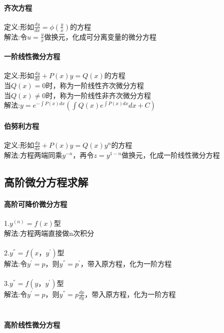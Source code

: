 \documentclass{article}
\begin{document}
\begin{flushleft}
	 \paragraph{齐次方程}
	 定义:形如$\frac{dy}{dx}=\phi(\frac{y}{x})$的方程\\
	 解法:令$u=\frac{y}{x}$做换元，化成可分离变量的微分方程\\
	 
	 \paragraph{一阶线性微分方程}
	 定义:形如$\frac{dy}{dx}+P(x)y=Q(x)$的方程\\
	 当$Q(x)=0$时，称为一阶线性齐次微分方程\\
	 当$Q(x)\neq 0$时，称为一阶线性非齐次微分方程\\
	 解法:$y=e^{-\int P(x)dx}(\int Q(x)e^{\int P(x)dx}dx+C)$\\
	 
	 \paragraph{伯努利方程}
	 定义:形如$\frac{dy}{dx}+P(x)y=Q(x)y^n$的方程\\
	 解法:方程两端同乘$y^{-n}$，再令$z=y^{1-n}$做换元，化成一阶线性微分方程\\
	 
	 \subsection{高阶微分方程求解}
	 
	 \paragraph{高阶可降价微分方程}
	 1.$y^{(n)}=f(x)$型\\
	 解法:方程两端直接做n次积分\\
	 ~\\
	 2.$y^{''}=f(x，y^{'})$型\\
	 解法:令$y^{'}=p$，则$y^{''}=p^{'}$，带入原方程，化为一阶方程\\
	 ~\\
	 3.$y^{''}=f(y，y^{'})$型\\
	 解法:令$y^{'}=p$，则$y^{''}=p\frac{dp}{dy}$，带入原方程，化为一阶方程\\
	 ~\\
	 \paragraph{高阶线性微分方程}
	 
\end{flushleft}
\end{document}
